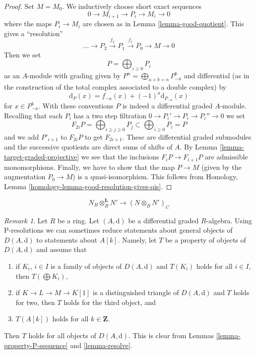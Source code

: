 \documentclass{stacks-project}
\theoremstyle{plain}
\theoremstyle{definition}
\theoremstyle{remark}
\newtheorem{remark}[subsection]{Remark}
\numberwithin{equation}{subsection}
\begin{document}
\begin{proof}
Set $M = M_0$. We inductively choose short exact sequences
$$
0 \to M_{i + 1} \to P_i \to M_i \to 0
$$
where the maps $P_i \to M_i$ are chosen as in Lemma \ref{lemma-good-quotient}.
This gives a ``resolution''
$$
\ldots \to P_2 \xrightarrow{f_2} P_1 \xrightarrow{f_1} P_0 \to M \to 0
$$
Then we set
$$
P = \bigoplus\nolimits_{i \geq 0} P_i
$$
as an $A$-module with grading given by
$P^n = \bigoplus_{a + b = n} P_{-a}^b$ and
differential (as in the construction of the total complex associated
to a double complex) by
$$
\text{d}_P(x) = f_{-a}(x) + (-1)^a \text{d}_{P_{-a}}(x)
$$
for $x \in P_{-a}^b$. With these conventions $P$ is indeed a differential
graded $A$-module. Recalling that each $P_i$ has a two step filtration
$0 \to P_i' \to P_i \to P_i'' \to 0$ we set
$$
F_{2i}P = \bigoplus\nolimits_{i \geq j \geq 0} P_j
\subset
\bigoplus\nolimits_{i \geq 0} P_i = P
$$
and we add $P'_{i + 1}$ to $F_{2i}P$ to get $F_{2i + 1}$.
These are differential graded submodules and the successive quotients
are direct sums of shifts of $A$. By
Lemma \ref{lemma-target-graded-projective} we see that
the inclusions $F_iP \to F_{i + 1}P$ are admissible monomorphisms.
Finally, we have to show that the map $P \to M$ (given by the
augmentation $P_0 \to M$) is a quasi-isomorphism. This follows from
Homology, Lemma \ref{homology-lemma-good-resolution-gives-qis}.
\end{proof}

\begin{equation}
\label{equation-plain-versus-derived}
N_B \otimes_B^\mathbf{L} N'
\longrightarrow
(N \otimes_B N')_C
\end{equation}

\begin{remark}
\label{remark-P-resolution}
Let $R$ be a ring. Let $(A, \text{d})$ be a differential graded $R$-algebra.
Using P-resolutions we can sometimes reduce statements about general
objects of $D(A, \text{d})$ to statements about $A[k]$. Namely, let
$T$ be a property of objects of $D(A, \text{d})$ and assume that
\begin{enumerate}
\item if $K_i$, $i \in I$ is a family of objects of $D(A, \text{d})$
and $T(K_i)$ holds for all $i \in I$, then $T(\bigoplus K_i)$,
\item if $K \to L \to M \to K[1]$ is a distinguished triangle of
$D(A, \text{d})$ and $T$ holds for two, then $T$
holds for the third object, and
\item $T(A[k])$ holds for all $k \in \mathbf{Z}$.
\end{enumerate}
Then $T$ holds for all objects of $D(A, \text{d})$. This is clear from
Lemmas \ref{lemma-property-P-sequence} and \ref{lemma-resolve}.
\end{remark}
\end{document}
